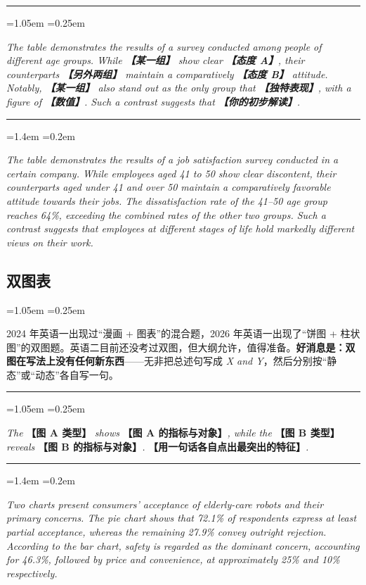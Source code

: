 \documentclass[11pt,a4paper]{ctexart}
\newcommand{\fillin}[1]{{\bfseries【#1】}}
\newcommand{\en}[1]{\textit{#1}}
\newenvironment{tpl}[1]{%
  \par\addvspace{7pt}\needspace{4\baselineskip}%
  \noindent{\bfseries\color{accent}#1}\par\nopagebreak
  \vspace{2pt}\noindent\rule{\linewidth}{0.7pt}\par\nopagebreak\vspace{3pt}%
  \begin{list}{}{\leftmargin=1.05em \rightmargin=0.25em \listparindent=0pt
    \itemindent=0pt \topsep=0pt \parsep=2.5pt \itemsep=2.5pt \partopsep=0pt}%
  \item\relax
}{%
  \end{list}\vspace{1pt}\noindent\rule{\linewidth}{0.7pt}\par\addvspace{8pt}%
}
\newenvironment{note}{%
  \par\addvspace{5pt}%
  \begin{list}{}{\leftmargin=1.05em \rightmargin=0.25em \listparindent=0pt
    \itemindent=0pt \topsep=0pt \parsep=2pt \itemsep=2pt \partopsep=0pt}%
  \item\relax\small\color{ink}%
}{%
  \end{list}\addvspace{5pt}%
}
\newenvironment{eg}{%
  \par\addvspace{4pt}%
  \begin{list}{}{\leftmargin=1.4em \rightmargin=0.2em \listparindent=0pt
    \itemindent=0pt \topsep=0pt \parsep=2pt \itemsep=2pt \partopsep=0pt}%
  \item\relax
}{%
  \end{list}\addvspace{5pt}%
}
\begin{document}
\begin{tpl}{半动态图第 1 段通用句式}
\en{The table demonstrates the results of a survey conducted among people of different age groups. While \fillin{某一组} show clear \fillin{态度 A}, their counterparts \fillin{另外两组} maintain a comparatively \fillin{态度 B} attitude. Notably, \fillin{某一组} also stand out as the only group that \fillin{独特表现}, with a figure of \fillin{数值}. Such a contrast suggests that \fillin{你的初步解读}.}
\end{tpl}

\begin{eg}
\en{The table demonstrates the results of a job satisfaction survey conducted in a certain company. While employees aged 41 to 50 show clear discontent, their counterparts aged under 41 and over 50 maintain a comparatively favorable attitude towards their jobs. The dissatisfaction rate of the 41--50 age group reaches 64\%, exceeding the combined rates of the other two groups. Such a contrast suggests that employees at different stages of life hold markedly different views on their work.}
\end{eg}

\subsection{双图表}

\begin{note}
2024 年英语一出现过“漫画 + 图表”的混合题，2026 年英语一出现了“饼图 + 柱状图”的双图题。英语二目前还没考过双图，但大纲允许，值得准备。\textbf{好消息是：双图在写法上没有任何新东西}——无非把总述句写成 \en{X and Y}，然后分别按“静态”或“动态”各自写一句。
\end{note}

\begin{tpl}{双图第 1 段公式}
\en{The} \fillin{图 A 类型} \en{shows} \fillin{图 A 的指标与对象}\en{, while the} \fillin{图 B 类型} \en{reveals} \fillin{图 B 的指标与对象}\en{.} \fillin{用一句话各自点出最突出的特征}\en{.}
\end{tpl}

\begin{eg}
\en{Two charts present consumers' acceptance of elderly-care robots and their primary concerns. The pie chart shows that 72.1\% of respondents express at least partial acceptance, whereas the remaining 27.9\% convey outright rejection. According to the bar chart, safety is regarded as the dominant concern, accounting for 46.3\%, followed by price and convenience, at approximately 25\% and 10\% respectively.}
\end{eg}
\end{document}
